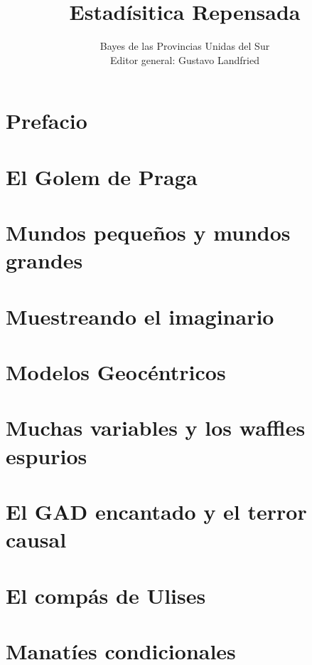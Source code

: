 \documentclass[a4paper,10pt]{book}
\title{\Huge Estad\'isitica Repensada}
\author{\LARGE Bayes de las Provincias Unidas del Sur \\ \vspace{12cm} \large Editor general: Gustavo Landfried}
\begin{document}
\maketitle
\tableofcontents

\newpage
\chapter{Prefacio}
 

\newpage
\chapter{El Golem de Praga}


\newpage
\chapter{Mundos peque\~nos y mundos grandes}


\newpage
\chapter{Muestreando el imaginario}


\newpage
\chapter{Modelos Geoc\'entricos}


\newpage
\chapter{Muchas variables y los waffles espurios}


\newpage
\chapter{El GAD encantado y el terror causal}


\newpage
\chapter{El comp\'as de Ulises}


\newpage
\chapter{Manat\'ies condicionales}

\end{document}
